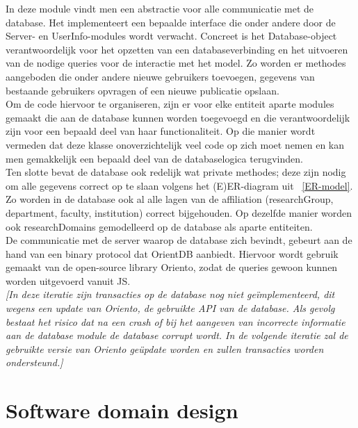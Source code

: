 \documentclass{article}
\begin{document}
In deze module vindt men een abstractie voor alle communicatie met de database. Het implementeert een bepaalde interface die onder andere door de Server- en UserInfo-modules wordt verwacht. Concreet is het Database-object verantwoordelijk voor het opzetten van een databaseverbinding en het uitvoeren van de nodige queries voor de interactie met het model. Zo worden er methodes aangeboden die onder andere nieuwe gebruikers toevoegen, gegevens van bestaande gebruikers opvragen of een nieuwe publicatie opslaan.\\

Om de code hiervoor te organiseren, zijn er voor elke entiteit aparte modules gemaakt die aan de database kunnen worden toegevoegd en die verantwoordelijk zijn voor een bepaald deel van haar functionaliteit. Op die manier wordt vermeden dat deze klasse onoverzichtelijk veel code op zich moet nemen en kan men gemakkelijk een bepaald deel van de databaselogica terugvinden. \\

Ten slotte bevat de database ook redelijk wat private methodes; deze zijn nodig om alle gegevens correct op te slaan volgens het (E)ER-diagram uit ~\ref{ER-model}. Zo worden in de database ook al alle lagen van de affiliation (researchGroup, department, faculty, institution) correct bijgehouden. Op dezelfde manier worden ook researchDomains gemodelleerd op de database als aparte entiteiten.\\

De communicatie met de server waarop de database zich bevindt, gebeurt aan de hand van een binary protocol dat OrientDB aanbiedt. Hiervoor wordt gebruik gemaakt van de open-source library Oriento, zodat de queries gewoon kunnen worden uitgevoerd vanuit JS. \\

\textit{[In deze iteratie zijn transacties op de database nog niet ge\"implementeerd, dit wegens een update van Oriento, de gebruikte API van de database. Als gevolg bestaat het risico dat na een crash of bij het aangeven van incorrecte informatie aan de database module de database corrupt wordt. In de volgende iteratie zal de gebruikte versie van Oriento ge\"update worden en zullen transacties worden ondersteund.]}

\clearpage

\section{Software domain design}
\end{document}

